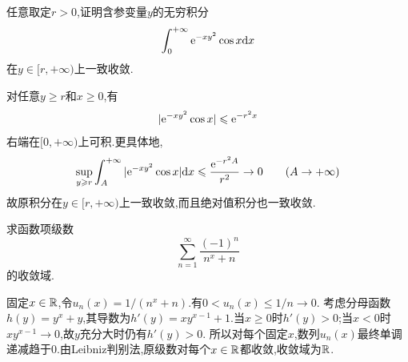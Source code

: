 \documentclass{ctexart}
\begin{document}
\begin{problem}[4.(15\songti{分})]
任意取定$r>0$,证明含参变量$y$的无穷积分
        \[\int_0^{+\infty}\mathrm{e}^{-xy^2}\cos x\mathrm{d} x\]
        在$y\in[r,+\infty)$上一致收敛.
\end{problem}
\begin{solution}
对任意$y\geqslant r$和$x\geqslant0$,有
\[|\mathrm{e}^{-xy^2}\cos x|\leqslant\mathrm{e}^{-r^2x}\]
右端在$[0,+\infty)$上可积.更具体地,
\[\sup_{y\geqslant r}\int_A^{+\infty}|\mathrm{e}^{-xy^2}\cos x|\mathrm{d} x
\leqslant\frac{\mathrm{e}^{-r^2A}}{r^2}\to0\qquad(A\to+\infty)\]
故原积分在$y\in[r,+\infty)$上一致收敛,而且绝对值积分也一致收敛.
\end{solution}

\begin{problem}[5.(10\songti{分})]
求函数项级数
        \[\sum_{n=1}^\infty\dfrac{(-1)^n}{n^x+n}\]
        的收敛域.
\end{problem}
\begin{solution}
固定$x\in\mathbb{R}$,令$u_n(x)=1/(n^x+n)$.有$0<u_n(x)\leqslant1/n\to0$.
考虑分母函数$h(y)=y^x+y$,其导数为$h'(y)=xy^{x-1}+1$.当$x\geqslant0$时$h'(y)>0$;当$x<0$时$xy^{x-1}\to0$,故$y$充分大时仍有$h'(y)>0$.
所以对每个固定$x$,数列$u_n(x)$最终单调递减趋于$0$.由Leibniz判别法,原级数对每个$x\in\mathbb{R}$都收敛,收敛域为$\mathbb{R}$.
\end{solution}
\end{document}
